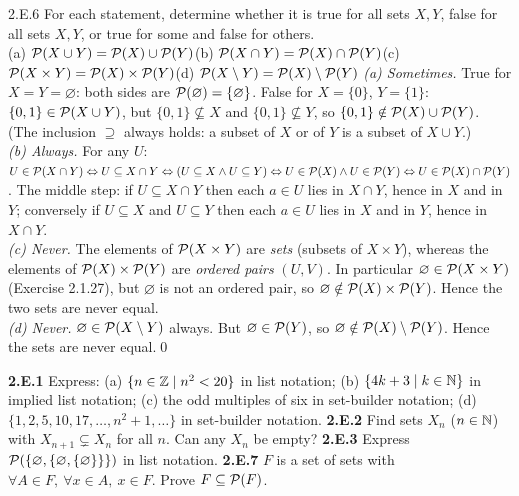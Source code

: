 \begin{bookex}[essential]{2.E.6}
For each statement, determine whether it is true for all sets $X,Y$, false for all sets $X,Y$, or true for some and false for others.\\
(a) $\mathcal{P}(X\cup Y)=\mathcal{P}(X)\cup\mathcal{P}(Y)$\quad (b) $\mathcal{P}(X\cap Y)=\mathcal{P}(X)\cap\mathcal{P}(Y)$\quad (c) $\mathcal{P}(X\times Y)=\mathcal{P}(X)\times\mathcal{P}(Y)$\quad (d) $\mathcal{P}(X\setminus Y)=\mathcal{P}(X)\setminus\mathcal{P}(Y)$
\solution
\emph{(a) Sometimes.} True for $X=Y=\varnothing$: both sides are $\mathcal{P}(\varnothing)=\{\varnothing\}$. False for $X=\{0\}$, $Y=\{1\}$: $\{0,1\}\in\mathcal{P}(X\cup Y)$, but $\{0,1\}\nsubseteq X$ and $\{0,1\}\nsubseteq Y$, so $\{0,1\}\notin\mathcal{P}(X)\cup\mathcal{P}(Y)$. (The inclusion $\supseteq$ always holds: a subset of $X$ or of $Y$ is a subset of $X\cup Y$.)\\
\emph{(b) Always.} For any $U$: $U\in\mathcal{P}(X\cap Y)\Leftrightarrow U\subseteq X\cap Y\Leftrightarrow(U\subseteq X\wedge U\subseteq Y)\Leftrightarrow U\in\mathcal{P}(X)\wedge U\in\mathcal{P}(Y)\Leftrightarrow U\in\mathcal{P}(X)\cap\mathcal{P}(Y)$. The middle step: if $U\subseteq X\cap Y$ then each $a\in U$ lies in $X\cap Y$, hence in $X$ and in $Y$; conversely if $U\subseteq X$ and $U\subseteq Y$ then each $a\in U$ lies in $X$ and in $Y$, hence in $X\cap Y$.\\
\emph{(c) Never.} The elements of $\mathcal{P}(X\times Y)$ are \emph{sets} (subsets of $X\times Y$), whereas the elements of $\mathcal{P}(X)\times\mathcal{P}(Y)$ are \emph{ordered pairs} $(U,V)$. In particular $\varnothing\in\mathcal{P}(X\times Y)$ (Exercise 2.1.27), but $\varnothing$ is not an ordered pair, so $\varnothing\notin\mathcal{P}(X)\times\mathcal{P}(Y)$. Hence the two sets are never equal.\\
\emph{(d) Never.} $\varnothing\in\mathcal{P}(X\setminus Y)$ always. But $\varnothing\in\mathcal{P}(Y)$, so $\varnothing\notin\mathcal{P}(X)\setminus\mathcal{P}(Y)$. Hence the sets are never equal.\qed
\end{bookex}

\begin{trybox}[{2.E.1, 2.E.2, 2.E.3, 2.E.7 \fO}]
\textbf{2.E.1} Express: (a) $\{n\in\mathbb{Z}\mid n^2<20\}$ in list notation; (b) $\{4k+3\mid k\in\mathbb{N}\}$ in implied list notation; (c) the odd multiples of six in set-builder notation; (d) $\{1,2,5,10,17,\dots,n^2+1,\dots\}$ in set-builder notation.\quad
\textbf{2.E.2} Find sets $X_n$ ($n\in\mathbb{N}$) with $X_{n+1}\subsetneq X_n$ for all $n$. Can any $X_n$ be empty?\quad
\textbf{2.E.3} Express $\mathcal{P}(\{\varnothing,\{\varnothing,\{\varnothing\}\}\})$ in list notation.\quad
\textbf{2.E.7} $F$ is a set of sets with $\forall A\in F,\ \forall x\in A,\ x\in F$. Prove $F\subseteq\mathcal{P}(F)$.
\end{trybox}

